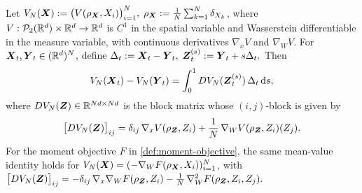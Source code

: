 \begin{lemma}
\label{lemma-mean-value-theorem}
Let $V_N(\boldsymbol{X})
:=
\bigl(V(\rho_{\boldsymbol{X}},X_i)\bigr)_{i=1}^N,\;
\rho_{\boldsymbol{X}}
:=
\frac1N\sum_{k=1}^N \delta_{X_k}$,
where \(V:\mathcal P_2(\mathbb{R}^d)\times \mathbb{R}^d\to\mathbb{R}^d\) is \(C^1\) in the spatial variable and Wasserstein differentiable in the measure variable, with continuous derivatives \(\nabla_x V\) and \(\nabla_W V\).
For \(\boldsymbol{X}_t,\boldsymbol{Y}_t\in(\mathbb{R}^d)^N\), define
$\Delta_t:=\boldsymbol{X}_t-\boldsymbol{Y}_t,\;
\boldsymbol{Z}_t^{(s)}:=\boldsymbol{Y}_t+s\Delta_t.
$
Then
\[
V_N(\boldsymbol{X}_t)-V_N(\boldsymbol{Y}_t)
=
\int_0^1 DV_N(\boldsymbol{Z}_t^{(s)})\,\Delta_t\,\dd s,
\]
where \(DV_N(\boldsymbol{Z})\in\mathbb{R}^{Nd\times Nd}\) is the block matrix whose \((i,j)\)-block is given by
\[
\bigl[DV_N(\boldsymbol{Z})\bigr]_{ij}
=
\delta_{ij}\,\nabla_x V(\rho_{\boldsymbol{Z}},Z_i)
+
\frac1N\,\nabla_W V(\rho_{\boldsymbol{Z}},Z_i)(Z_j).
\]
For the moment objective \(F\) in \cref{def:moment-objective}, the same
mean-value identity holds for
\(V_N(\boldsymbol{X})=(-\nabla_WF(\rho_{\boldsymbol{X}},X_i))_{i=1}^N\), with $\bigl[DV_N(\boldsymbol{Z})\bigr]_{ij}
=
-\delta_{ij}\,\nabla_x\nabla_W F(\rho_{\boldsymbol{Z}},Z_i)
-\frac1N\,\nabla_W^2F(\rho_{\boldsymbol{Z}},Z_i,Z_j).$
\end{lemma}
